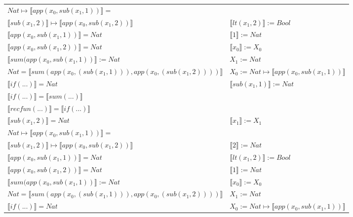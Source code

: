 \begin{exercise}
\begin{description}
\begin{center}
\begin{longtable}{ | l | l | }
                        $Nat \mapsto  \llbracket app(x_0, sub(x_1,1)) \rrbracket = $ & \\
			     $ \llbracket sub(x_1,2) \rrbracket \mapsto  \llbracket app(x_0, sub(x_1,2)) \rrbracket$ & $ \llbracket lt(x_1 , 2) \rrbracket := Bool$  \\
                        $ \llbracket app(x_0, sub(x_1,1)) \rrbracket = Nat$ &  $ \llbracket 1 \rrbracket := Nat$  \\
                        $ \llbracket app(x_0, sub(x_1,2)) \rrbracket = Nat$ & $ \llbracket x_0 \rrbracket := X_0$  \\
                        $ \llbracket sum(app(x_0, sub(x_1,1)) \rrbracket := Nat$ &  $X_1 := Nat$ \\
                        $Nat =  \llbracket sum(app(x_0, (sub(x_1,1))), app(x_0, (sub(x_1,2)))) \rrbracket$ & $X_0 := Nat \mapsto  \llbracket app(x_0, sub(x_1,1)) \rrbracket$ \\
                        $ \llbracket if(...) \rrbracket = Nat$ &   $ \llbracket sub(x_1,1) \rrbracket := Nat$ \\
                        $ \llbracket if(...) \rrbracket =  \llbracket sum(...) \rrbracket$ & \\
                        $ \llbracket recfun(...) \rrbracket =  \llbracket if(...) \rrbracket$ & \\
                    \hline
                        $ \llbracket sub(x_1,2) \rrbracket = Nat$ & $ \llbracket x_1 \rrbracket := X_1$  \\
                        $Nat \mapsto  \llbracket app(x_0, sub(x_1,1)) \rrbracket =$ & \\ 
			     $ \llbracket sub(x_1,2) \rrbracket \mapsto  \llbracket app(x_0, sub(x_1,2)) \rrbracket$ & $ \llbracket 2 \rrbracket := Nat$ \\
                        $ \llbracket app(x_0, sub(x_1,1)) \rrbracket = Nat$ & $ \llbracket lt(x_1 , 2) \rrbracket := Bool$\\
                        $ \llbracket app(x_0, sub(x_1,2)) \rrbracket = Nat$ &  $ \llbracket 1 \rrbracket := Nat$\\
                        $ \llbracket sum(app(x_0, sub(x_1,1)) \rrbracket := Nat$ & $ \llbracket x_0 \rrbracket := X_0$\\
                        $Nat =  \llbracket sum(app(x_0, (sub(x_1,1))), app(x_0, (sub(x_1,2)))) \rrbracket$ & $X_1 := Nat$\\
                        $ \llbracket if(...) \rrbracket = Nat$ & $X_0 := Nat \mapsto  \llbracket app(x_0, sub(x_1,1)) \rrbracket$\\

\end{longtable}
\end{center}
\end{description}
\end{exercise}
